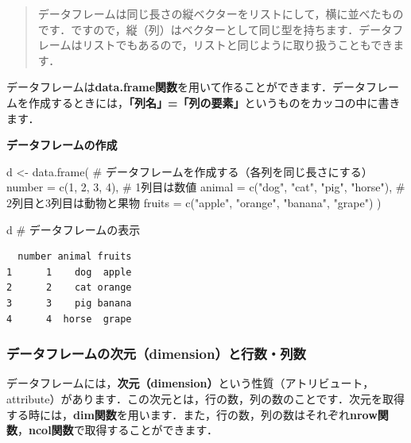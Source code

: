 \documentclass[
  letterpaper,
  DIV=11,
  numbers=noendperiod]{scrreprt}
\newenvironment{Shaded}{\begin{snugshade}}{\end{snugshade}}
\newcommand{\AttributeTok}[1]{\textcolor[rgb]{0.40,0.45,0.13}{#1}}
\newcommand{\CommentTok}[1]{\textcolor[rgb]{0.37,0.37,0.37}{#1}}
\newcommand{\DecValTok}[1]{\textcolor[rgb]{0.68,0.00,0.00}{#1}}
\newcommand{\FunctionTok}[1]{\textcolor[rgb]{0.28,0.35,0.67}{#1}}
\newcommand{\NormalTok}[1]{\textcolor[rgb]{0.00,0.23,0.31}{#1}}
\newcommand{\OtherTok}[1]{\textcolor[rgb]{0.00,0.23,0.31}{#1}}
\newcommand{\StringTok}[1]{\textcolor[rgb]{0.13,0.47,0.30}{#1}}
\begin{document}
\begin{quote}
データフレームは同じ長さの縦ベクターをリストにして，横に並べたものです．ですので，縦（列）はベクターとして同じ型を持ちます．データフレームはリストでもあるので，リストと同じように取り扱うこともできます．
\end{quote}

データフレームは\textbf{data.frame関数}を用いて作ることができます．データフレームを作成するときには，\textbf{「列名」=「列の要素」}というものをカッコの中に書きます．

\textbf{データフレームの作成}

\begin{Shaded}
\begin{Highlighting}[]
\NormalTok{d }\OtherTok{\textless{}{-}} \FunctionTok{data.frame}\NormalTok{( }\CommentTok{\# データフレームを作成する（各列を同じ長さにする）}
  \AttributeTok{number =} \FunctionTok{c}\NormalTok{(}\DecValTok{1}\NormalTok{, }\DecValTok{2}\NormalTok{, }\DecValTok{3}\NormalTok{, }\DecValTok{4}\NormalTok{), }\CommentTok{\# 1列目は数値}
  \AttributeTok{animal =} \FunctionTok{c}\NormalTok{(}\StringTok{"dog"}\NormalTok{, }\StringTok{"cat"}\NormalTok{, }\StringTok{"pig"}\NormalTok{, }\StringTok{"horse"}\NormalTok{), }\CommentTok{\# 2列目と3列目は動物と果物}
  \AttributeTok{fruits =} \FunctionTok{c}\NormalTok{(}\StringTok{"apple"}\NormalTok{, }\StringTok{"orange"}\NormalTok{, }\StringTok{"banana"}\NormalTok{, }\StringTok{"grape"}\NormalTok{)}
\NormalTok{)}

\NormalTok{d }\CommentTok{\# データフレームの表示}
\end{Highlighting}
\end{Shaded}

\begin{verbatim}
  number animal fruits
1      1    dog  apple
2      2    cat orange
3      3    pig banana
4      4  horse  grape
\end{verbatim}

\hypertarget{ux30c7ux30fcux30bfux30d5ux30ecux30fcux30e0ux306eux6b21ux5143dimensionux3068ux884cux6570ux5217ux6570}{%
\subsubsection{データフレームの次元（dimension）と行数・列数}\label{ux30c7ux30fcux30bfux30d5ux30ecux30fcux30e0ux306eux6b21ux5143dimensionux3068ux884cux6570ux5217ux6570}}

データフレームには，\textbf{次元（dimension）}という性質（アトリビュート，attribute）があります．この次元とは，行の数，列の数のことです．次元を取得する時には，\textbf{dim関数}を用います．また，行の数，列の数はそれぞれ\textbf{nrow関数}，\textbf{ncol関数}で取得することができます．
\end{document}
